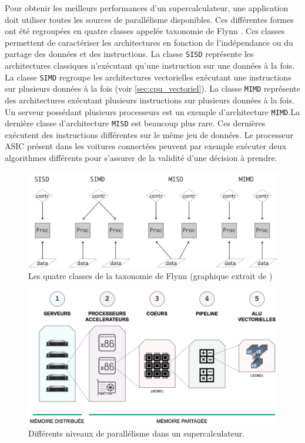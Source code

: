             Pour obtenir les meilleurs performances d'un supercalculateur, une application doit utiliser toutes les sources de parallélisme disponibles. Ces différentes formes ont été regroupées en quatre classes appelée taxonomie de Flynn \cite{Flynn2011}. Ces classes permettent de caractériser les architectures en fonction de l'indépendance ou du partage des données et des instructions. La classe \verb=SISD= représente les architectures classiques n'exécutant qu'une instruction sur une données à la fois. 
            La classe \verb=SIMD= regroupe les architectures vectorielles exécutant une instructions sur plusieurs données à la fois (voir \autoref{sec:cpu_vectoriel}). La classe \verb|MIMD| représente des architectures exécutant plusieurs instructions sur plusieurs données à la fois. Un serveur possédant plusieurs processeurs est un exemple d'architecture \verb|MIMD|.La dernière classe d'architecture \verb|MISD| est beaucoup plus rare. Ces dernières exécutent des instructions différentes sur le même jeu de données. Le processeur ASIC présent dans les voitures connectées peuvent par exemple exécuter deux algorithmes différents pour s'assurer de la validité d'une décision à prendre. 
            
            
            
            
            \begin{figure}
            \center
            \includegraphics[width=12cm]{images/flynn.png}
            \caption{\label{fig:flynn} Les quatre classes de la taxonomie de Flynn (graphique extrait de \cite{Eijkhout2013})}
            \end{figure}
            
            
            
            
            \begin{figure}
                \center
                \includegraphics[width=14cm]{images/parallele_hpc.png}
                \caption{\label{fig:parallele_hpc} Différents niveaux de parallélisme dans un supercalculateur.}
            \end{figure}
    
